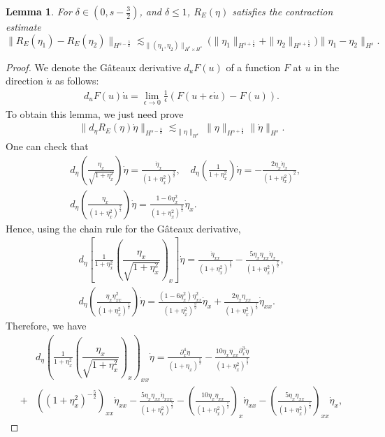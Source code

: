 \documentclass[12pt]{amsart}
\newtheorem{lemma}[theorem]{Lemma}
\theoremstyle{definition}
\numberwithin{equation}{section}
\newcommand{\p}{\partial}
\newcommand{\e}{\epsilon}
\newcommand{\f}{\frac}
\begin{document}
\begin{lemma} \label{t:REEst}
For $\delta\in (0,s- \f32)$, and $\delta \leq 1$, $R_E(\eta)$ satisfies the contraction estimate
\begin{equation*}
 \|R_E(\eta_1) - R_E(\eta_2) \|_{H^{s-\f32}} \lesssim_{\|(\eta_1, \eta_2)\|_{H^s \times H^s}}  \Big(\|\eta_1\|_{H^{s+\f52}}+ \|\eta_2\|_{H^{s+\f52}} \Big) \| \eta_1 -\eta_2\|_{H^s}.
\end{equation*}
\end{lemma}
\begin{proof}
We denote the G\^{a}teaux derivative $d_uF(u)$ of a function $F$ at $u$ in the direction $\dot{u}$ as follows:
\begin{align*}
d_uF(u)\dot{u}=\lim_{\e\to0}\f{1}{\e}(F(u+\e\dot{u})-F(u)).
\end{align*}
To obtain this lemma, we just need prove
\begin{align} \label{dEtaREEta}
\|d_\eta R_{E}(\eta)\dot{\eta}\|_{H^{s-\f32}}\lesssim_{\|\eta\|_{H^s}}  \|\eta\|_{H^{s+\f52}} \| \dot{\eta}\|_{H^s}.
\end{align}
One can check that
\begin{align*}
&d_{\eta}\left(\f{\eta_x}{\sqrt{1+\eta_x^2}}\right)\dot{\eta}=\f{\dot{\eta}_x}{(1+\eta_x^2)^{\f32}},\quad
d_{\eta}\left(\f{1}{1+\eta_x^2}\right)\dot{\eta}=-\f{2\eta_x\dot{\eta}_x}{(1+\eta_x^2)^2},\\
&d_{\eta}\left(\f{\eta_x}{(1+\eta_x^2)^{\f72}}\right)\dot{\eta}=\f{1-6\eta_x^2}{(1+\eta_x^2)^{\f92}}\dot{\eta}_x.
\end{align*}
Hence, using the chain rule for the G\^{a}teaux derivative,
\begin{align*}
d_{\eta}\left[\f{1}{1+\eta_x^2}\left(\dfrac{\eta_x}{\sqrt{1+\eta_x^2}}\right)_x \right]\dot{\eta}
=\f{\dot{\eta}_{xx}}{(1+\eta^2_x)^{\f52}}-\f{5\eta_x\eta_{xx}\dot{\eta}_x}{(1+\eta_x^2)^{\f72}},\\
d_{\eta}\left(\f{\eta_x\eta_{xx}^2}{(1+\eta^2_x)^{\f72}}\right)\dot{\eta}
=\f{(1-6\eta_x^2)\eta^2_{xx}}{(1+\eta_x^2)^{\f92}}\dot{\eta}_x
+\f{2\eta_x\eta_{xx}}{(1+\eta_x^2)^{\f72}}\dot{\eta}_{xx}.
\end{align*}
Therefore, we have
\begin{align*}
&d_{\eta}\left(\f{1}{1+\eta_x^2}\left(\dfrac{\eta_x}{\sqrt{1+\eta_x^2}}\right)_x\right)_{xx}\dot{\eta}=\f{\p_x^4\dot{\eta}}{(1+\eta_x)^{\f52}}-\f{10\eta_x\eta_{xx}\p^3_x\dot{\eta}}{(1+\eta_x^2)^{\f72}}\\
+&((1+\eta^2_x)^{-\f52})_{xx}\dot{\eta}_{xx}-\f{5\eta_x\eta_{xx}\dot{\eta}_{xxx}}{(1+\eta_x^2)^{\f72}}-\left(\f{10\eta_x\eta_{xx}}{(1+\eta_x^2)^{\f72}}\right)_x\dot{\eta}_{xx}-\left(\f{5\eta_x\eta_{xx}}{(1+\eta_x^2)^{\f72}}\right)_{xx}\dot{\eta}_{x},

\end{align*}
\end{proof}
\end{document}
